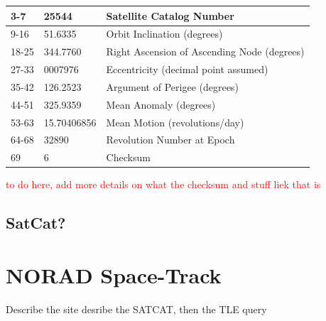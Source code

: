 \documentclass[12pt]{report}
\begin{document}
\begin{table}[h!]
{\begin{tabular}{|l|l|l|}
				3-7                                     & 25544                                   & Satellite Catalog Number                                                        \\ \hline
				9-16                                    & 51.6335                                 & Orbit Inclination (degrees)                                                     \\ \hline
				18-25                                   & 344.7760                                & Right Ascension of Ascending Node (degrees)                                     \\ \hline
				27-33                                   & 0007976                                 & Eccentricity (decimal point assumed)                                            \\ \hline
				35-42                                   & 126.2523                                & Argument of Perigee (degrees)                                                   \\ \hline
				44-51                                   & 325.9359                                & Mean Anomaly (degrees)                                                          \\ \hline
				53-63                                   & 15.70406856                             & Mean Motion (revolutions/day)                                                   \\ \hline
				64-68                                   & 32890                                   & Revolution Number at Epoch                                                      \\ \hline
				69                                      & 6                                       & Checksum                                                                        \\ \hline
			\end{tabular}%
		}
	\end{table}
	
	\textcolor{red}{to do here, add more details on what the checksum and stuff liek that is}
	\subsection{SatCat?}
	\section{NORAD Space-Track}	
	Describe the site
	desribe the SATCAT, then the TLE query
	
\end{document}

